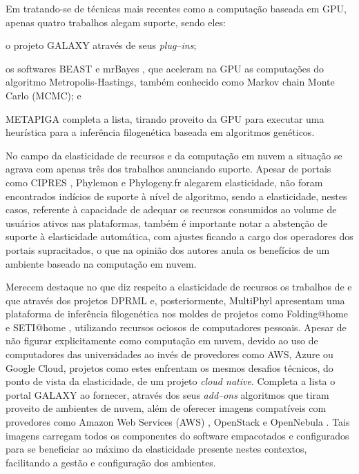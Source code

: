 \documentclass[english,brazilian]{UNISINOSmonografia} %
\begin{document}
Em tratando-se de técnicas mais recentes como a computação baseada em GPU, apenas quatro trabalhos alegam suporte, sendo eles:
\begin{inparaenum}
	\item o projeto GALAXY \cite{Afgan2016} através de seus \textit{plug--ins};
	\item os softwares BEAST \cite{Drummond2002} e mrBayes \cite{Huelsenbeck2001}, que aceleram na GPU as computações do algoritmo Metropolis-Hastings, também conhecido como Markov chain Monte Carlo (MCMC); e
	\item METAPIGA \cite{Helaers2010} completa a lista, tirando proveito da GPU para executar uma heurística para a inferência filogenética baseada em algoritmos genéticos.
\end{inparaenum}


No campo da elasticidade de recursos e da computação em nuvem a situação se agrava com apenas três dos trabalhos anunciando suporte.
Apesar de portais como CIPRES \cite{Miller2010}, Phylemon \cite{Tarraga2007,Sanchez2011} e Phylogeny.fr \cite{Dereeper2008} alegarem elasticidade, não foram encontrados indícios de suporte à nível de algoritmo, sendo a elasticidade, nestes casos, referente à capacidade de adequar os recursos consumidos ao volume de usuários ativos nas plataformas, também é importante notar a abstenção de suporte à elasticidade automática, com ajustes ficando a cargo dos operadores dos portais supracitados, o que na opinião dos autores anula os benefícios de um ambiente baseado na computação em nuvem.


Merecem destaque no que diz respeito a elasticidade de recursos os trabalhos de  e  que através dos projetos DPRML e, posteriormente, MultiPhyl apresentam uma plataforma de inferência filogenética nos moldes de projetos como Folding@home \cite{Shirts2000,Larson2002} e SETI@home \cite{Korpela2001}, utilizando recursos ociosos de computadores pessoais.
Apesar de não figurar explicitamente como computação em nuvem, devido ao uso de computadores das universidades ao invés de provedores como AWS, Azure ou Google Cloud, projetos como estes enfrentam os mesmos desafios técnicos, do ponto de vista da elasticidade, de um projeto \textit{cloud native}.
Completa a lista o portal GALAXY \cite{Afgan2016} ao fornecer, através dos seus \textit{add--ons} algoritmos que tiram proveito de ambientes de nuvem, além de oferecer imagens compatíveis com provedores como Amazon Web Services (AWS) \cite{Varia2017}, OpenStack \cite{Sefraoui2012} e OpenNebula \cite{Milojicic2011}.
Tais imagens carregam todos os componentes do software empacotados e configurados para se beneficiar ao máximo da elasticidade presente nestes contextos, facilitando a gestão e configuração dos ambientes.
\end{document}
